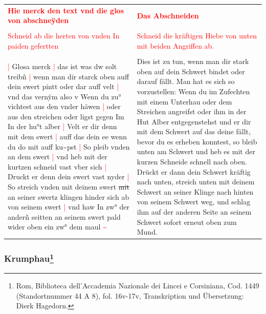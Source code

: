 \begin{longtable}{p{6.25cm}p{6.25cm}}
    \textbf{\textcolor{red}{
        Hie merck den text vnd die glos von abschneÿden}}
    &
    \textbf{\textcolor{red}{
        Das Abschneiden}}
    \\
    \\
    \textcolor{red}{
        Schneid ab die herten von vnden In paiden gefertten}
    &
    \textcolor{red}{
        Schneid die kräftigen Hiebe von unten mit beiden Angriffen ab.}
    \\
    \\
    \textcolor{red}{|} Glosa merck
    \textcolor{red}{|} das ist was dw solt treibñ
    \textcolor{red}{|} wenn man dir starck oben auff dein swert pintt oder dar auff velt
    \textcolor{red}{|} vnd das vernÿm also v Wenn du zu° vichtest aus den vnder häwen
    \textcolor{red}{|} oder aus den streichen oder ligst gegen Im In der hu°t alber
    \textcolor{red}{|} Velt er dir denn mit dem swert
    \textcolor{red}{|} auff das dein ee wenn du do mit auff ku\textasciitilde{}pst
    \textcolor{red}{|} So pleib vnden an dem swert
    \textcolor{red}{|} vnd heb mit der kurtzen schneid vast vber sich
    \textcolor{red}{|} Druckt er denn dein swert vast nyder
    \textcolor{red}{|} So streich vnden mit deinem swert \st{mit} an seiner swertz klingen hinder sich ab von seinem swert
    \textcolor{red}{|} vnd haw In zw° der anderñ seitten an seinem swert pald wider oben ein zw° dem maul \textcolor{red}{\textasciitilde{}}
    &
    Dies ist zu tun, wenn man dir stark oben auf dein Schwert bindet oder darauf fällt.
    Man hat es sich so vorzustellen: Wenn du im Zufechten mit einem Unterhau oder dem Streichen angreifst oder ihm in der Hut Alber entgegenstehst und er dir mit dem Schwert auf das deine fällt, bevor du es erheben konntest, so bleib unten am Schwert und heb es mit der kurzen Schneide schnell nach oben.
    Drückt er dann dein Schwert kräftig nach unten, streich unten mit deinem Schwert an seiner Klinge nach hinten von seinem Schwert weg, und schlag ihm auf der anderen Seite an seinem Schwert sofort erneut oben zum Mund.
\end{longtable}

\newpage

\begin{center}
\end{center}

\newpage

\subsubsection[Krumphau]{
    Krumphau\footnote{
        \hspace*{0.5ex}Rom, Biblioteca dell'Accademia Nazionale dei Lincei e Corsiniana,
        Cod. 1449 (Standortnummer 44 A 8), fol. 16v-17v, Transkription und Übersetzung: Dierk Hagedorn.}}

